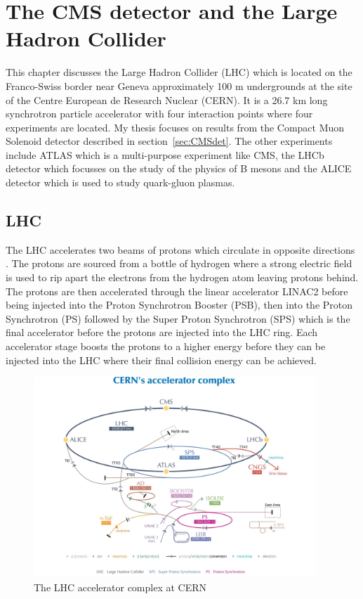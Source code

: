 \chapter{The CMS detector and the Large Hadron Collider}
\label{c:det}
This chapter discusses the Large Hadron Collider (LHC) which is located on the Franco-Swiss border near Geneva approximately 100 m undergrounds at the site of the Centre European de Research Nuclear (CERN). It is a 26.7 km long synchrotron particle accelerator with four interaction points where four experiments are located.  My thesis focuses on results from the Compact Muon Solenoid detector described in section~\ref{sec:CMSdet}. The other experiments include ATLAS which is a multi-purpose experiment like CMS, the LHCb detector which focusses on the study of the physics of B mesons and the ALICE detector which is used to study quark-gluon plasmas.

\section{LHC}

The LHC accelerates two beams of protons which circulate in opposite directions . The protons are sourced from a bottle of hydrogen where a strong electric field is used to rip apart the electrons from the hydrogen atom leaving protons behind. The protons are then accelerated through the linear accelerator LINAC2 before being injected into the Proton Synchrotron Booster (PSB), then into the Proton Synchrotron (PS) followed by the Super Proton Synchrotron (SPS) which is the final accelerator before the protons are injected into the LHC ring. Each accelerator stage boosts the protons to a higher energy before they can be injected into the LHC where their final collision energy can be achieved.

\begin{figure}[ht!]
\centering
    \includegraphics[width=0.95\textwidth]{images/LHCacc.jpg}
    \caption{The LHC accelerator complex at CERN}
    \label{fig:LHC acc}
\end{figure}


